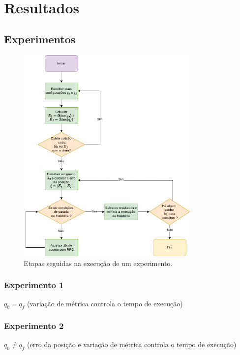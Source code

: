 \chapter{Resultados}\label{cap:results}

\section{Experimentos}

\begin{figure}
    \centering
    \includegraphics[width=0.8\textwidth]{./Images/exp-flow.png}
    \caption{Etapas seguidas na execução de um experimento.}\label{fig:exp-flow}
\end{figure}

\subsection*{Experimento 1}

$q_0 = q_f$ (variação de métrica controla o tempo de execução)

\subsection*{Experimento 2}

$q_0 \neq q_f$ (erro da posição e variação de métrica controla o tempo
de execução)

